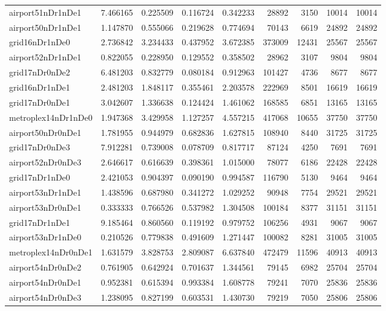 \begin{longtable}{|l|r|r|r|r|r|r|r|r|}
airport51nDr1nDe1 & 7.466165 & 0.225509 & 0.116724 & 0.342233 & 28892 & 3150 & 10014 & 10014 \\
airport50nDr1nDe1 & 1.147870 & 0.555066 & 0.219628 & 0.774694 & 70143 & 6619 & 24892 & 24892 \\
grid16nDr1nDe0 & 2.736842 & 3.234433 & 0.437952 & 3.672385 & 373009 & 12431 & 25567 & 25567 \\
airport52nDr1nDe1 & 0.822055 & 0.228950 & 0.129552 & 0.358502 & 28962 & 3107 & 9804 & 9804 \\
grid17nDr0nDe2 & 6.481203 & 0.832779 & 0.080184 & 0.912963 & 101427 & 4736 & 8677 & 8677 \\
grid16nDr1nDe1 & 2.481203 & 1.848117 & 0.355461 & 2.203578 & 222969 & 8501 & 16619 & 16619 \\
grid17nDr0nDe1 & 3.042607 & 1.336638 & 0.124424 & 1.461062 & 168585 & 6851 & 13165 & 13165 \\
metroplex14nDr1nDe0 & 1.947368 & 3.429958 & 1.127257 & 4.557215 & 417068 & 10655 & 37750 & 37750 \\
airport50nDr0nDe1 & 1.781955 & 0.944979 & 0.682836 & 1.627815 & 108940 & 8440 & 31725 & 31725 \\
grid17nDr0nDe3 & 7.912281 & 0.739008 & 0.078709 & 0.817717 & 87124 & 4250 & 7691 & 7691 \\
airport52nDr0nDe3 & 2.646617 & 0.616639 & 0.398361 & 1.015000 & 78077 & 6186 & 22428 & 22428 \\
grid17nDr1nDe0 & 2.421053 & 0.904397 & 0.090190 & 0.994587 & 116790 & 5130 & 9464 & 9464 \\
airport53nDr1nDe1 & 1.438596 & 0.687980 & 0.341272 & 1.029252 & 90948 & 7754 & 29521 & 29521 \\
airport53nDr0nDe1 & 0.333333 & 0.766526 & 0.537982 & 1.304508 & 100184 & 8377 & 31151 & 31151 \\
grid17nDr1nDe1 & 9.185464 & 0.860560 & 0.119192 & 0.979752 & 106256 & 4931 & 9067 & 9067 \\
airport53nDr1nDe0 & 0.210526 & 0.779838 & 0.491609 & 1.271447 & 100082 & 8281 & 31005 & 31005 \\
metroplex14nDr0nDe1 & 1.631579 & 3.828753 & 2.809087 & 6.637840 & 472479 & 11596 & 40913 & 40913 \\
airport54nDr0nDe2 & 0.761905 & 0.642924 & 0.701637 & 1.344561 & 79145 & 6982 & 25704 & 25704 \\
airport54nDr0nDe1 & 0.952381 & 0.615394 & 0.993384 & 1.608778 & 79241 & 7070 & 25836 & 25836 \\
airport54nDr0nDe3 & 1.238095 & 0.827199 & 0.603531 & 1.430730 & 79219 & 7050 & 25806 & 25806 \\

\end{longtable}
